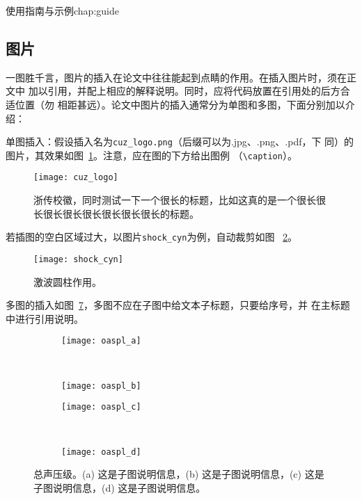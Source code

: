 \begin{cuzchapter}{使用指南与示例}{chap:guide}
    \subsection{图片}\label{sub:images}

    一图胜千言，图片的插入在论文中往往能起到点睛的作用。在插入图片时，须在正文中
    加以引用，并配上相应的解释说明。同时，应将代码放置在引用处的后方合适位置（勿
    相距甚远）。论文中图片的插入通常分为单图和多图，下面分别加以介绍：

    单图插入：假设插入名为\verb|cuz_logo.png|（后缀可以为.jpg、.png、.pdf，下
    同）的图片，其效果如图~\ref{fig:cuz_logo}。注意，应在图的下方给出图例
    （\verb|\caption|）。
    \begin{figure}[h]
        \centering
        \texttt{[image: cuz\_logo]}
        \caption[浙传校徽]{浙传校徽，同时测试一下一个很长的标题，比如这真的是一个很长很长很长很长很长很长很长很长的标题。}
        \label{fig:cuz_logo}
    \end{figure}

    若插图的空白区域过大，以图片\verb|shock_cyn|为例，自动裁剪如图
    ~\ref{fig:shock_cyn}。
    \begin{figure}[h]
        \centering
        \texttt{[image: shock\_cyn]}
        \caption[激波圆柱作用]{激波圆柱作用。}
        \label{fig:shock_cyn}
    \end{figure}

    多图的插入如图~\ref{fig:oaspl}，多图不应在子图中给文本子标题，只要给序号，并
    在主标题中进行引用说明。
    \begin{figure}[h]
        \centering
        \begin{subfigure}[b]{0.35\textwidth}
            \texttt{[image: oaspl\_a]}
            \caption{}
            \label{fig:oaspl_a}
        \end{subfigure}%
        ~%
        \begin{subfigure}[b]{0.35\textwidth}
            \texttt{[image: oaspl\_b]}
            \caption{}
            \label{fig:oaspl_b}
        \end{subfigure}
        \begin{subfigure}[b]{0.35\textwidth}
            \texttt{[image: oaspl\_c]}
            \caption{}
            \label{fig:oaspl_c}
        \end{subfigure}%
        ~%
        \begin{subfigure}[b]{0.35\textwidth}
            \texttt{[image: oaspl\_d]}
            \caption{}
            \label{fig:oaspl_d}
        \end{subfigure}
        \caption[总声压级]{总声压级。(a) 这是子图说明信息，(b) 这是子图说明信息，(c) 这是子图说明信息，(d) 这是子图说明信息。}
        \label{fig:oaspl}
    \end{figure}


\end{cuzchapter}

